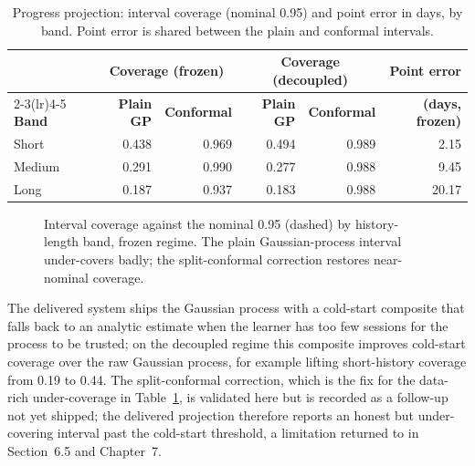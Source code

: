 \begin{table}[htbp]
\centering
\footnotesize
\caption{Progress projection: interval coverage (nominal 0.95) and point error in days, by band. Point error is shared between the plain and conformal intervals.}
\label{tab:res-proj}
\begin{tabular}{l r r r r r}
\toprule
& \multicolumn{2}{c}{\textbf{Coverage (frozen)}} & \multicolumn{2}{c}{\textbf{Coverage (decoupled)}} & \textbf{Point error} \\
\cmidrule(lr){2-3}\cmidrule(lr){4-5}
\textbf{Band} & \textbf{Plain GP} & \textbf{Conformal} & \textbf{Plain GP} & \textbf{Conformal} & \textbf{(days, frozen)} \\
\midrule
Short & 0.438 & 0.969 & 0.494 & 0.989 & 2.15 \\
Medium & 0.291 & 0.990 & 0.277 & 0.988 & 9.45 \\
Long & 0.187 & 0.937 & 0.183 & 0.988 & 20.17 \\
\bottomrule
\end{tabular}
\end{table}

\begin{figure}[htbp]
\centering
{}
\caption{Interval coverage against the nominal 0.95 (dashed) by history-length band, frozen regime. The plain Gaussian-process interval under-covers badly; the split-conformal correction restores near-nominal coverage.}
\label{fig:res-coverage}
\end{figure}

The delivered system ships the Gaussian process with a cold-start composite that falls back to an analytic estimate when the learner has too few sessions for the process to be trusted; on the decoupled regime this composite improves cold-start coverage over the raw Gaussian process, for example lifting short-history coverage from 0.19 to 0.44. The split-conformal correction, which is the fix for the data-rich under-coverage in Table~\ref{tab:res-proj}, is validated here but is recorded as a follow-up not yet shipped; the delivered projection therefore reports an honest but under-covering interval past the cold-start threshold, a limitation returned to in Section~6.5 and Chapter~7.

